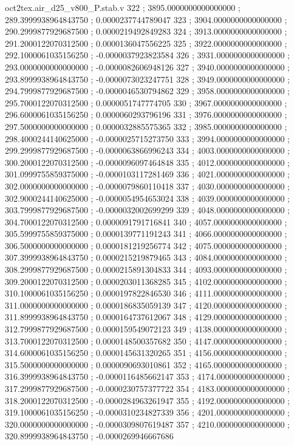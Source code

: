 \begin{filecontents}[overwrite]{oct2tex.air_d25_v800_P.stab.v}
322 ; 3895.0000000000000000 ; 289.3999938964843750 ; 0.0000237744789047
323 ; 3904.0000000000000000 ; 290.2999877929687500 ; 0.0000219492849283
324 ; 3913.0000000000000000 ; 291.2000122070312500 ; 0.0000136047556225
325 ; 3922.0000000000000000 ; 292.1000061035156250 ; -0.0000037923823584
326 ; 3931.0000000000000000 ; 293.0000000000000000 ; -0.0000082606948126
327 ; 3940.0000000000000000 ; 293.8999938964843750 ; -0.0000073023247751
328 ; 3949.0000000000000000 ; 294.7999877929687500 ; -0.0000046530794862
329 ; 3958.0000000000000000 ; 295.7000122070312500 ; 0.0000051747774705
330 ; 3967.0000000000000000 ; 296.6000061035156250 ; 0.0000060293796196
331 ; 3976.0000000000000000 ; 297.5000000000000000 ; 0.0000032885575365
332 ; 3985.0000000000000000 ; 298.4000244140625000 ; -0.0000025715273750
333 ; 3994.0000000000000000 ; 299.2999877929687500 ; -0.0000063866996243
334 ; 4003.0000000000000000 ; 300.2000122070312500 ; -0.0000096097464848
335 ; 4012.0000000000000000 ; 301.0999755859375000 ; -0.0000103117281469
336 ; 4021.0000000000000000 ; 302.0000000000000000 ; -0.0000079860110418
337 ; 4030.0000000000000000 ; 302.9000244140625000 ; -0.0000054954653024
338 ; 4039.0000000000000000 ; 303.7999877929687500 ; -0.0000032002699299
339 ; 4048.0000000000000000 ; 304.7000122070312500 ; 0.0000091791716841
340 ; 4057.0000000000000000 ; 305.5999755859375000 ; 0.0000139771191243
341 ; 4066.0000000000000000 ; 306.5000000000000000 ; 0.0000181219256774
342 ; 4075.0000000000000000 ; 307.3999938964843750 ; 0.0000215219879465
343 ; 4084.0000000000000000 ; 308.2999877929687500 ; 0.0000215891304833
344 ; 4093.0000000000000000 ; 309.2000122070312500 ; 0.0000203011368285
345 ; 4102.0000000000000000 ; 310.1000061035156250 ; 0.0000197822846530
346 ; 4111.0000000000000000 ; 311.0000000000000000 ; 0.0000186835059139
347 ; 4120.0000000000000000 ; 311.8999938964843750 ; 0.0000164737612067
348 ; 4129.0000000000000000 ; 312.7999877929687500 ; 0.0000159549072123
349 ; 4138.0000000000000000 ; 313.7000122070312500 ; 0.0000148500357682
350 ; 4147.0000000000000000 ; 314.6000061035156250 ; 0.0000145631320265
351 ; 4156.0000000000000000 ; 315.5000000000000000 ; 0.0000090693010861
352 ; 4165.0000000000000000 ; 316.3999938964843750 ; -0.0000116485662147
353 ; 4174.0000000000000000 ; 317.2999877929687500 ; -0.0000230757377722
354 ; 4183.0000000000000000 ; 318.2000122070312500 ; -0.0000284963261947
355 ; 4192.0000000000000000 ; 319.1000061035156250 ; -0.0000310234827339
356 ; 4201.0000000000000000 ; 320.0000000000000000 ; -0.0000309807619487
357 ; 4210.0000000000000000 ; 320.8999938964843750 ; -0.0000269946667686

\end{filecontents}
